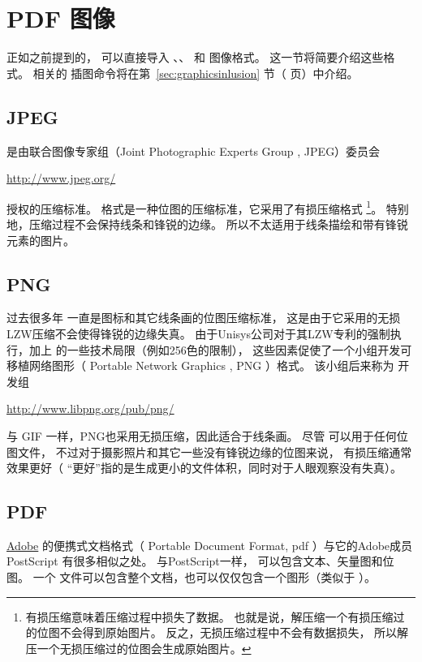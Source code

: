 \section{PDF 图像}\label{sec:pdfgraphics}
正如之前提到的，\pdfTeX{} 可以直接导入 、、 和  图像格式。
这一节将简要介绍这些格式。
相关的\pdfTeX{} 插图命令将在第~\ref{sec:graphicsinlusion} 节（\pageref{sec:graphicsinclusion} 页）中介绍。

\subsection{JPEG}\label{ssec:jpeg}
 是由联合图像专家组（Joint Photographic Experts Group , JPEG）委员会
\begin{center}
	\url{http://www.jpeg.org/}
\end{center}
授权的压缩标准。
 格式是一种位图的压缩标准，它采用了有损压缩格式
\footnote{有损压缩意味着压缩过程中损失了数据。
	也就是说，解压缩一个有损压缩过的位图不会得到原始图片。
	反之，无损压缩过程中不会有数据损失，
	所以解压一个无损压缩过的位图会生成原始图片。}。
特别地，压缩过程不会保持线条和锋锐的边缘。
所以不太适用于线条描绘和带有锋锐元素的图片。

\subsection{PNG}\label{ssec:png}
过去很多年  一直是图标和其它线条画的位图压缩标准，
这是由于它采用的无损LZW压缩不会使得锋锐的边缘失真。
由于Unisys公司对于其LZW专利的强制执行，加上 的一些技术局限（例如256色的限制），
这些因素促使了一个小组开发可移植网络图形（ Portable Network Graphics , PNG ）格式。
该小组后来称为  开发组
\begin{center}
\url{http://www.libpng.org/pub/png/}
\end{center}
与 GIF 一样，PNG也采用无损压缩，因此适合于线条画。
尽管  可以用于任何位图文件，
不过对于摄影照片和其它一些没有锋锐边缘的位图来说，
 有损压缩通常效果更好（ “更好”指的是生成更小的文件体积，同时对于人眼观察没有失真）。

\subsection{PDF}\label{ssec:pdf}
\href{http://www.adobe.com}{Adobe} 的便携式文档格式（ Portable Document Format, pdf ）与它的Adobe成员 PostScript 有很多相似之处。
与PostScript一样， 可以包含文本、矢量图和位图。
一个  文件可以包含整个文档，也可以仅仅包含一个图形（类似于  ）。

